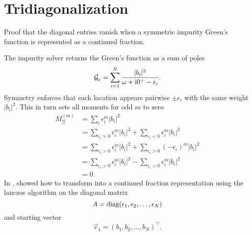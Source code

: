 
\chapter{Tridiagonalization}

Proof that the diagonal entries vanish when a symmetric impurity Green's function
is represented as a continued fraction.

The impurity solver returns the Green's function as a sum of poles
\begin{align}
    \mathcal{G}_{\!\omega} = \sum_{i=1}^N \frac{|b_i|^2}{\omega + \mathrm{i}0^+ - \epsilon_i}.
    \label{eq:impurity-greens-function}
\end{align}
Symmetry enforces that each location appears pairwise $\pm\epsilon_i$
with the same weight $|b_i|^2$.
This in turn sets all moments for odd $m$ to zero 
\begin{align}
    M^{(m)}_{\mathcal{G}}
     & =
    \sum_i \epsilon_i^m |b_i|^2                                                            \\
     & =
    \sum_{\epsilon_i>0} \epsilon_i^m |b_i|^2 + \sum_{\epsilon_i<0} \epsilon_i^m |b_i|^2    \\
     & =
    \sum_{\epsilon_i>0} \epsilon_i^m |b_i|^2 + \sum_{\epsilon_i>0} (-\epsilon_i)^m |b_i|^2 \\
     & =
    \sum_{\epsilon_i>0} \epsilon_i^m |b_i|^2 - \sum_{\epsilon_i>0} \epsilon_i^m |b_i|^2    \\
     & =
    0.
\end{align}
In \cite[appendix B]{Lu2014}, \citeauthor{Lu2014} showed how to transform
 into a continued fraction representation
using the lanczos algorithm on the diagonal matrix
\begin{equation}
    A
    =
    \operatorname{diag}(\epsilon_1, \epsilon_2, \ldots, \epsilon_N)
\end{equation}
and starting vector
\begin{equation}
    \vec{v}_1 = (b_1, b_2, \ldots, b_N)^\intercal.
\end{equation}

